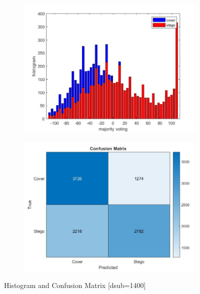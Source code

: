 \begin{figure}[H]
    \begin{subfigure}[b]{0.5\textwidth}
        \includegraphics[width=\textwidth]{img/1400/gray1400histo.jpg}
    \end{subfigure}
    \hfill
    \begin{subfigure}[b]{0.5\textwidth}
        \includegraphics[width=\textwidth]{img/1400/gray1400confuse.jpg}
    \end{subfigure}
    \caption{Histogram and Confusion Matrix [dsub=1400]}
\end{figure}


